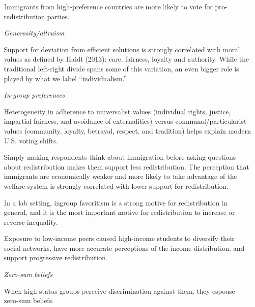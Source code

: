 \documentclass{article}
\newcommand{\citem}[1]{\medskip \noindent \textbf{\cite*{#1}}}
\newcommand{\textm}[1]{\medskip \noindent \textit{#1}}
\begin{document}
Immigrants from high-preference countries are more likely to vote for pro-redistribution parties.

\textm{Generosity/altruism}

\citem{landier2022neoliberal}

Support for deviation from efficient solutions is strongly correlated with moral values as defined by Haidt (2013): care, fairness, loyalty and authority. While the traditional left-right divide spans some of this variation, an even bigger role is played by what we label ``individualism.''

\textm{In-group preferences}

\citem{enke2020moral}

Heterogeneity in adherence to universalist values (individual rights, justice, impartial fairness, and avoidance of externalities) versus communal/particularist values (community, loyalty, betrayal, respect, and tradition) helps explain modern U.S. voting shifts.

\citem{alesina2023immigration}

Simply making respondents think about immigration before asking questions about redistribution makes them support less redistribution. The perception that immigrants are economically weaker and more likely to take advantage of the welfare system is strongly correlated with lower support for redistribution. 

\citem{fischbacher2023identity}

In a lab setting, ingroup favoritism is a strong motive for redistribution in general, and it is the most important motive for redistribution to increase or reverse inequality.

\citem{londono2022impact}

Exposure to low-income peers caused high-income students to diversify their social networks, have more accurate perceptions of the income distribution, and support progressive redistribution.

\textm{Zero-sum beliefs}

\citem{wilkins2015you}

When high status groups perceive discrimination against them, they espouse zero-sum beliefs.
\end{document}
